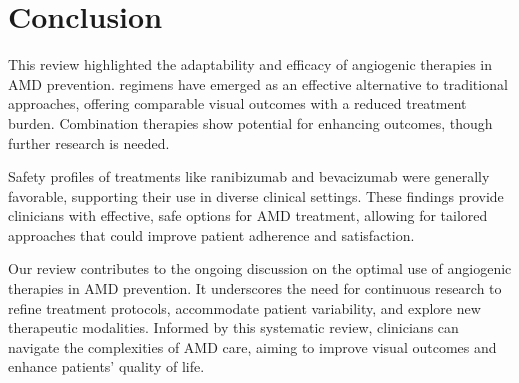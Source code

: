 \newpage
\section{Conclusion}\label{s:conclusion}

This review highlighted the adaptability and efficacy of angiogenic therapies in AMD prevention. \TreatAndExtend regimens have emerged as an effective alternative to traditional approaches, offering comparable visual outcomes with a reduced treatment burden. Combination therapies show potential for enhancing outcomes, though further research is needed.

Safety profiles of treatments like ranibizumab and bevacizumab were generally favorable, supporting their use in diverse clinical settings. These findings provide clinicians with effective, safe options for AMD treatment, allowing for tailored approaches that could improve patient adherence and satisfaction.

Our review contributes to the ongoing discussion on the optimal use of angiogenic therapies in AMD prevention. It underscores the need for continuous research to refine treatment protocols, accommodate patient variability, and explore new therapeutic modalities. Informed by this systematic review, clinicians can navigate the complexities of AMD care, aiming to improve visual outcomes and enhance patients' quality of life.
